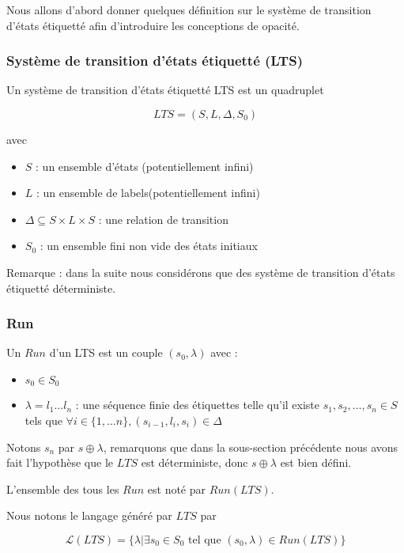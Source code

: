 \documentclass[10pt,a4paper]{article}
\begin{document}
Nous allons d'abord donner quelques d\'efinition sur le syst\`eme de transition d'\'etats \'etiquett\'e afin d'introduire les conceptions de opacit\'e.

\subsubsection{Syst\`eme de transition d'\'etats \'etiquett\'e (LTS)}

Un syst\`eme de transition d'\'etats \'etiquett\'e LTS est un quadruplet 

$$LTS = (S,L,\Delta,S_0)$$

avec
\begin{itemize}
	\item $S$ : un ensemble d'\'etats (potentiellement infini)
	\item $L$ : un ensemble de labels(potentiellement infini)
	\item $\Delta \subseteq S\times L \times S$ : une relation de transition
	\item $S_0$ : un ensemble fini non vide des \'etats initiaux 
\end{itemize}

Remarque : dans la suite nous consid\'erons que des syst\`eme de transition d'\'etats \'etiquett\'e d\'eterministe.

\subsubsection{Run}

Un $Run$ d'un LTS est un couple $(s_0,\lambda)$ avec :

\begin{itemize}
	\item $s_0 \in S_0$
	\item $\lambda = l_1 \dots l_n$ : une s\'equence finie des \'etiquettes telle qu'il existe $s_1,s_2,\dots ,s_n \in S$ tels que $\forall i \in \{1, \dots n\}, (s_{i-1},l_i,s_i) \in \Delta$ 
\end{itemize}

Notons $s_n$ par $s\oplus \lambda$, remarquons que dans la sous-section pr\'ec\'edente nous avons fait l'hypoth\`ese que le $LTS$ est d\'eterministe, donc $s\oplus \lambda$ est bien d\'efini.

L'ensemble des tous les $Run$ est not\'e par $Run(LTS)$.

Nous notons le langage g\'en\'er\'e par $LTS$ par 

$$\mathcal{L}(LTS) = \{\lambda | \exists s_0 \in S_0 \mbox{ tel que } (s_0,\lambda) \in Run(LTS)\}$$
\end{document}
